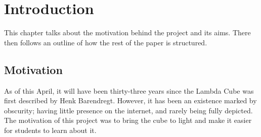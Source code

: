 \documentclass{l4proj}
\begin{document}
%
%
%
%
%
%
%
%
\chapter{Introduction}


This chapter talks about the motivation behind the project and its aims.  There then follows an outline of how the rest of the paper is structured.

\section{Motivation}

As of this April, it will have been thirty-three years since the Lambda Cube was first described by Henk Barendregt.  However, it has been an existence marked by obscurity; having little presence on the internet, and rarely being fully depicted.  The motivation of this project was to bring the cube to light and make it easier for students to learn about it.
\end{document}

